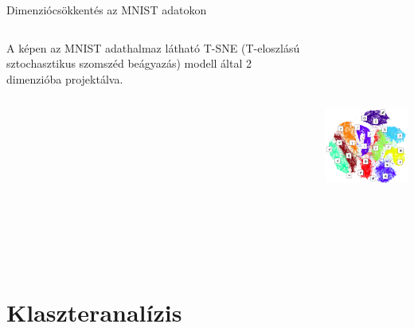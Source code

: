 \documentclass[english, aspectratio=169]{beamer}
\makeatletter
\let\origtableofcontents=\tableofcontents
\def\tableofcontents{\@ifnextchar[{\origtableofcontents}{\gobbletableofcontents}}
\def\gobbletableofcontents#1{\origtableofcontents}
\makeatother
\begin{document}
\begin{frame}{Dimenziócsökkentés az MNIST adatokon}
\begin{columns}
\begin{column}{.5\textwidth}
A képen az MNIST adathalmaz látható T-SNE (T-eloszlású sztochasztikus szomszéd beágyazás) modell által 2 dimenzióba projektálva.\par\smallskip
\end{column}
\begin{column}{.5\textwidth}
\begin{center}
\includegraphics[width=6cm, height=7cm, keepaspectratio]{images/unsupervised_16.png}
\end{center}
\end{column}
\end{columns}
\end{frame}

\section{Klaszteranalízis}

\begin{frame}
\tableofcontents[currentsection]
\end{frame}
\end{document}
